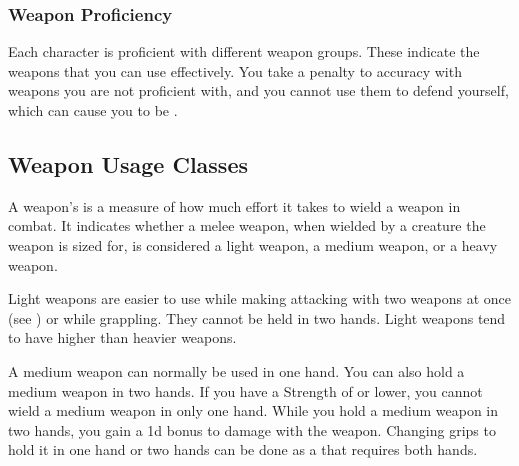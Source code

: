         \subsubsection{Weapon Proficiency}\label{Weapon Proficiency}
            Each character is proficient with different weapon groups. These indicate the weapons that you can use effectively. You take a  penalty to accuracy with weapons you are not proficient with, and you cannot use them to defend yourself, which can cause you to be .

    \subsection{Weapon Usage Classes}\label{Weapon Usage Classes}
        A weapon's  is a measure of how much effort it takes to wield a weapon in combat.
        It indicates whether a melee weapon, when wielded by a creature the weapon is sized for, is considered a light weapon, a medium weapon, or a heavy weapon.


        \label{Light Weapons} Light weapons are easier to use while making attacking with two weapons at once (see ) or while grappling.
        They cannot be held in two hands.
        Light weapons tend to have higher  than heavier weapons.

         A medium weapon can normally be used in one hand.
        You can also hold a medium weapon in two hands.
        If you have a Strength of  or lower, you cannot wield a medium weapon in only one hand.
        While you hold a medium weapon in two hands, you gain a \plus1d bonus to damage with the weapon.
        Changing grips to hold it in one hand or two hands can be done as a  that requires both hands.

